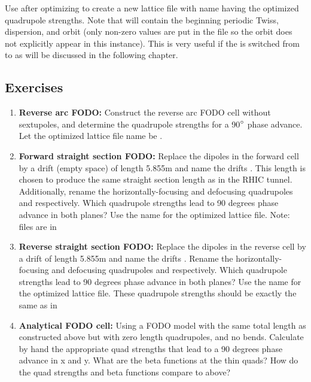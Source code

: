 \documentclass{hitec}     %
\begin{document}
{Use  after optimizing to create a new lattice file with name  having the optimized quadrupole strengths. 
Note that  will contain the beginning periodic Twiss, dispersion, and
orbit (only non-zero values are put in the file so the orbit does not explicitly appear in this instance). This is very useful if the
 is switched from  to  as will be discussed in the following chapter.

\subsection{Exercises}
\label{s:fodo.ex}

\begin{enumerate}[leftmargin=*]
\item {\bf Reverse arc FODO:} Construct the reverse arc FODO cell without sextupoles, and determine the quadrupole strengths for a 90$\degree$ phase advance. Let the optimized lattice file name be .
%
\item {\bf Forward straight section FODO:} Replace the dipoles in the forward cell by a drift (empty space) of length 5.855m and name the drifts . This length is chosen to produce the same straight section length as in the RHIC tunnel. Additionally, rename the horizontally-focusing and defocusing quadrupoles  and  respectively. Which quadrupole strengths lead to 90 degrees phase advance in both planes? 
Use the name  for the optimized lattice file. Note: files are in 
%
\item {\bf Reverse straight section FODO:}  Replace the dipoles in the reverse cell by a drift of length 5.855m and name the drifts . Rename the horizontally-focusing and defocusing quadrupoles  and  respectively. Which quadrupole strengths lead to 90 degrees phase advance in both planes? 
Use the name  for the optimized lattice file. 
These quadrupole strengths should be exactly the same as in 
%
\item {\bf Analytical FODO cell:} Using a FODO model with the same total length as constructed above but
with zero length quadrupoles, and no bends. Calculate by hand the appropriate quad strengths that lead to a 90 degrees phase advance in x and y. What are the beta functions at the thin quads? How do the quad strengths and beta functions compare to above?

\end{enumerate}}
\end{document}
